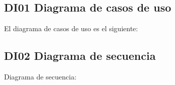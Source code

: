 \newpage
\subsection{DI01 Diagrama de casos de uso}
	El diagrama de casos de uso es el siguiente:

\subsection{DI02 Diagrama de secuencia}
	Diagrama de secuencia: 

%
%
%
%
%
%

